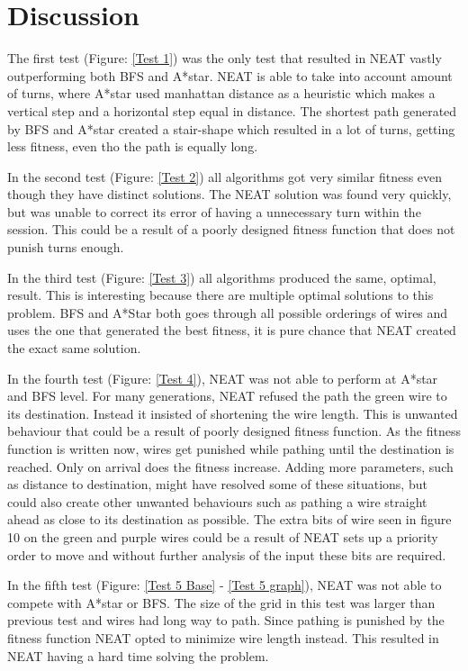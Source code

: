 \documentclass{kththesis}
\begin{document}
\chapter{Discussion}
The first test (Figure: \ref{Test 1}) was the only test that resulted in NEAT vastly outperforming both BFS and A*star. NEAT is able to take into account amount of turns, where A*star used manhattan distance as a heuristic which makes a vertical step and a horizontal step equal in distance. The shortest path generated by BFS and A*star created a stair-shape which resulted in a lot of turns, getting less fitness, even tho the path is equally long. 

In the second test (Figure: \ref{Test 2}) all algorithms got very similar fitness even though they have distinct solutions. The NEAT solution was found very quickly, but was unable to correct its error of having a unnecessary turn within the session. This could be a result of a poorly designed fitness function that does not punish turns enough. 

In the third test (Figure: \ref{Test 3}) all algorithms produced the same, optimal, result. This is interesting because there are multiple optimal solutions to this problem. BFS and A*Star both goes through all possible orderings of wires and uses the one that generated the best fitness, it is pure chance that NEAT created the exact same solution. 

In the fourth test (Figure: \ref{Test 4}), NEAT was not able to perform at A*star and BFS level. For many generations, NEAT refused the path the green wire to its destination. Instead it insisted of shortening the wire length. This is unwanted behaviour that could be a result of poorly designed fitness function. As the fitness function is written now, wires get punished while pathing until the destination is reached. Only on arrival does the fitness increase. Adding more parameters, such as distance to destination, might have resolved some of these situations, but could also create other unwanted behaviours such as pathing a wire straight ahead as close to its destination as possible. The extra bits of wire seen in figure 10 on the green and purple wires could be a result of NEAT sets up a priority order to move and without further analysis of the input these bits are required.

In the fifth test (Figure: \ref{Test 5 Base} - \ref{Test 5 graph}), NEAT was not able to compete with A*star or BFS. The size of the grid in this test was larger than previous test and wires had long way to path. Since pathing is punished by the fitness function NEAT opted to minimize wire length instead. This resulted in NEAT having a hard time solving the problem. 
\end{document}
